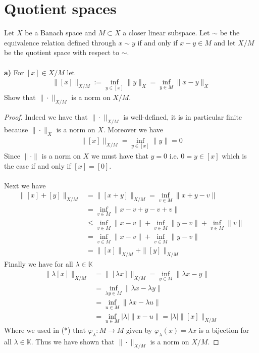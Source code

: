 \documentclass[12pt,a4paper]{article}
\author{Marco Bertenghi}
\theoremstyle{definition}
\begin{document}
\section{Quotient spaces}
Let $X$ be a Banach space and $M \subset X$ a closer linear subspace. Let $\sim$ be the equivalence relation defined through $x \sim y$ if and only if $x-y \in M$ and let $X/M$ be the quotient space with respect to $\sim.$
\\\\
\textbf{a)} For $[x] \in X/M$ let 
\begin{align*}
\|[x]\|_{X/M}:= \inf_{y \in [x]} \| y \|_X = \inf_{y \in M} \|x-y\|_X
\end{align*}
Show that $\| \cdot \|_{X/M}$ is a norm on $X/M$. 
\begin{proof}
Indeed we have that $\| \cdot \|_{X/M}$ is well-defined, it is in particular finite because $\| \cdot \|_X$ is a norm on $X$. Moreover we have
\begin{align*}
\| [x]\|_{X/M} = \inf_{y \in[x]} \|y\| = 0 
\end{align*}
Since $\| \cdot \|$ is a norm on $X$ we must have that $y=0$ i.e. $0=y \in [x]$ which is the case if and only if $[x]=[0]$.
\\\\
Next we have
\begin{align*}
\| [x] + [y]\|_{X/M} &= \| [x+y]\|_{X/M} = \inf_{v \in M} \| x+y-v\| \\
&= \inf_{v \in M} \| x-v + y-v + v\| \\ 
& \leq \inf_{v \in M} \| x-v\| + \inf_{v \in M} \|y-v\| + \inf_{v \in M} \|v\| \\
& = \inf_{v \in M} \|x-v\| + \inf_{v \in M} \|y-v\|   \\
& 
= \| [x]\|_{X/M} + \|[y]\|_{X/M} 
\end{align*}
Finally we have for all $\lambda \in \mathbb{K}$
\begin{align*}
\| \lambda [x]\|_{X/M} &=  \|[ \lambda x] \|_{X/M} = \inf_{y \in M} \| \lambda x -y\|  \\
& = \inf_{ \lambda y  \in M} \| \lambda x - \lambda y\| \\
&= \inf_{u \in M} \| \lambda x - \lambda u\| \tag{*} \\
 & = \inf_{u \in M} | \lambda | \|x-u\| = | \lambda | \| [x] \|_{X/M} 
\end{align*}
 Where we used in (*) that $\varphi_\lambda : M \to M$ given by $ \varphi_\lambda(x)= \lambda x$ is a bijection for all $\lambda \in \mathbb{K}$. Thus we have shown that $\| \cdot \|_{X/M}$ is a norm on $X/M$. 
\end{proof}
\end{document}
